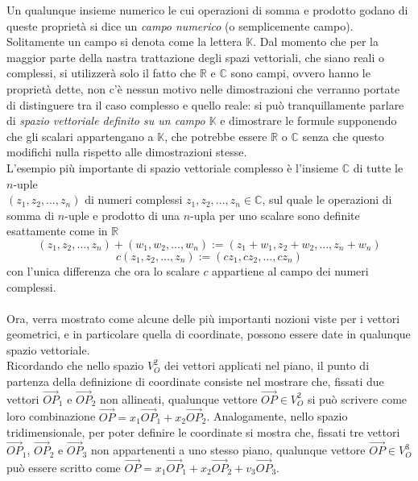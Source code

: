 \documentclass{book}
\theoremstyle{definition}
\theoremstyle{plain}
\begin{document}
Un qualunque insieme numerico le cui operazioni di somma e prodotto godano di queste proprietà si dice un \textit{campo numerico} (o semplicemente campo). Solitamente un campo si denota come la lettera $\mathds{K}$. Dal momento che per la maggior parte della nastra trattazione degli spazi vettoriali, che siano reali o complessi, si utilizzerà solo il fatto che $\mathds{R}$ e $\mathds{C}$ sono campi, ovvero hanno le proprietà dette, non c'è nessun motivo nelle dimostrazioni che verranno portate di distinguere tra il caso complesso e quello reale: si può tranquillamente parlare di \textit{spazio vettoriale definito su un campo $\mathds{K}$} e dimostrare le formule supponendo che gli scalari appartengano a $\mathds{K}$, che potrebbe essere  $\mathds{R}$ o $\mathds{C}$ senza che questo modifichi nulla rispetto alle dimostrazioni stesse.\\
L'esempio più importante di spazio vettoriale complesso è l'insieme  $\mathds{C}$ di tutte le $n$-uple\\ $(z_1,z_2,\dots,z_n)$ di numeri complessi $z_1,z_2,\dots,z_n\in \mathds{C}$, sul quale le operazioni di somma di $n$-uple e prodotto di una $n$-upla per uno scalare sono definite esattamente come in $\mathds{R}$
\begin{equation}
  \label{eq:spaziovect3}
  (z_1,z_2,\dots,z_n)+(w_1,w_2,\dots,w_n):=(z_1+w_1,z_2+w_2,\dots,z_n+w_n)
\end{equation}
\begin{equation}
  \label{eq:spaziovect4}
  c(z_1,z_2,\dots,z_n):=(cz_1,cz_2,\dots,cz_n)
\end{equation}
con l'unica differenza che ora lo scalare $c$ appartiene al campo dei numeri complessi.\\\\
Ora, verra mostrato come alcune delle più importanti nozioni viste per i vettori geometrici, e in particolare quella di coordinate, possono essere date in qualunque spazio vettoriale.\\
Ricordando che nello spazio $V^2_O$ dei vettori applicati nel piano, il punto di partenza della definizione di coordinate consiste nel mostrare che, fissati due vettori $\vec{OP}_1$ e $\vec{OP}_2$ non allineati, qualunque vettore $\vec{OP}\in V_O^2$ si può scrivere come loro combinazione $\vec{OP}=x_1\vec{OP}_1+x_2\vec{OP}_2$. Analogamente, nello spazio tridimensionale, per poter definire le coordinate si mostra che, fissati tre vettori $\vec{OP}_1$, $\vec{OP}_2$ e $\vec{OP}_3$ non appartenenti a uno stesso piano, qualunque vettore $\vec{OP}\in V_O^3$ può essere scritto come $\vec{OP}=x_1\vec{OP}_1+x_2\vec{OP}_2+v_3\vec{OP}_3$.\\
\end{document}
